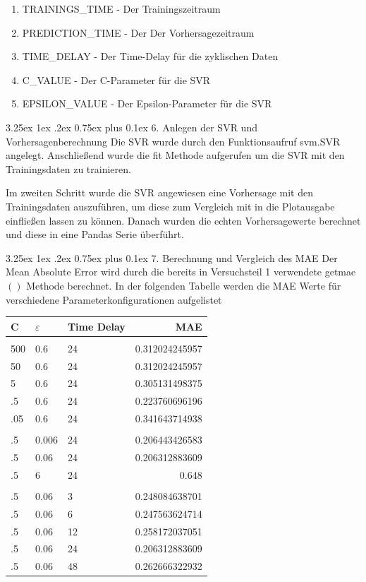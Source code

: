 \documentclass[12pt,a4paper]{scrartcl}
\makeatletter
\renewcommand\subparagraph{\@startsection{subparagraph}{5}{\parindent}%
    {3.25ex \@plus1ex \@minus .2ex}%
    {0.75ex plus 0.1ex}%
    {\normalfont\normalsize\bfseries}}
\makeatother
\begin{document}
\begin{enumerate}
\item TRAININGS\_TIME - Der Trainingszeitraum
\item PREDICTION\_TIME - Der Der Vorhersagezeitraum
\item TIME\_DELAY - Der Time-Delay für die zyklischen Daten
\item C\_VALUE - Der C-Parameter für die SVR
\item EPSILON\_VALUE - Der Epsilon-Parameter für die SVR
\end{enumerate}

\subparagraph{6. Anlegen der SVR und Vorhersagenberechnung}
Die SVR wurde durch den Funktionsaufruf svm.SVR angelegt.
Anschließend wurde die fit Methode aufgerufen um die SVR mit den Trainingsdaten zu trainieren.

Im zweiten Schritt wurde die SVR angewiesen eine Vorhersage mit den Trainingsdaten auszuführen,
um diese zum Vergleich mit in die Plotausgabe einfließen lassen zu können.
Danach wurden die echten Vorhersagewerte berechnet und diese in eine Pandas Serie überführt.

\subparagraph{7. Berechnung und Vergleich des MAE}
Der Mean Absolute Error wird durch die bereits in Versuchsteil 1 verwendete getmae$\left(\right)$ Methode berechnet.
In der folgenden Tabelle werden die MAE Werte für verschiedene Parameterkonfigurationen aufgelistet

\begin{center}
\begin{tabular}{l l l r}
 C & $\varepsilon$ & Time Delay & MAE\\ 
\hline \\
 500 & 0.6 & 24 & 0.312024245957\\
 50 & 0.6 & 24 & 0.312024245957\\
 5 & 0.6 & 24 & 0.305131498375\\
 .5 & 0.6 & 24 & 0.223760696196\\
 .05 & 0.6 & 24 & 0.341643714938\\
 \hline \\
 .5 & 0.006 & 24 & 0.206443426583\\
 .5 & 0.06 & 24 & 0.206312883609\\
 .5 & 6 & 24 & 0.648\\
 \hline \\
 .5 & 0.06 & 3 & 0.248084638701\\
 .5 & 0.06 & 6 & 0.247563624714\\
 .5 & 0.06 & 12 & 0.258172037051\\
 .5 & 0.06 & 24 & 0.206312883609\\
 .5 & 0.06 & 48 & 0.262666322932\\
\end{tabular}
\end{center}
\end{document}
